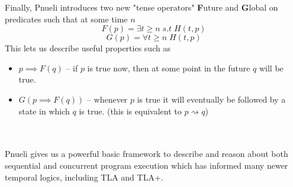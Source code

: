 \documentclass{uit-thesis}
\newcommand{\eventually}{\rightsquigarrow}
\begin{document}
Finally, Pnueli introduces two new "tense operators" \textbf{F}uture and \textbf{G}lobal on predicates such that at some time $n$
$$F(p) = \exists t \geq n \; s.t\; H(t,p)$$
$$G(p) = \forall t \geq n \; H(t,p)$$
This lets us describe useful properties such as
\begin{itemize}[label={}]
    \item $p \implies F(q)$ -- if $p$ is true now, then at some point in the future $q$ will be true.
    \item $G(p \implies F(q))$ -- whenever $p$ is true it will eventually be followed by a state in which $q$ is true. (this is equivalent to $p \eventually q$)     
\end{itemize}
\\\\
Pnueli gives us a powerful basic framework to describe and reason about both sequential and concurrent program execution which has informed many newer temporal logics, including TLA and TLA+.
\end{document}
